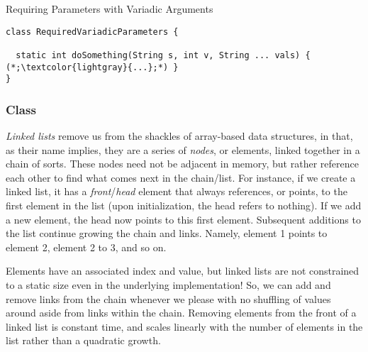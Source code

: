 
\begin{cl}[]{Requiring Parameters with Variadic Arguments}
\begin{lstlisting}[language=MyJava]
class RequiredVariadicParameters {

  static int doSomething(String s, int v, String ... vals) { (*;\textcolor{lightgray}{...};*) }
}
\end{lstlisting}
\end{cl}

\subsubsection*{ Class}
\textit{Linked lists} remove us from the shackles of array-based data structures, in that, as their name implies, they are a series of \textit{nodes}, or elements, linked together in a chain of sorts. These nodes need not be adjacent in memory, but rather reference each other to find what comes next in the chain/list. For instance, if we create a linked list, it has a \textit{front}/\textit{head} element that always references, or points, to the first element in the list (upon initialization, the head refers to nothing). If we add a new element, the head now points to this first element. Subsequent additions to the list continue growing the chain and links. Namely, element 1 points to element 2, element 2 to 3, and so on. 

Elements have an associated index and value, but linked lists are not constrained to a static size even in the underlying implementation! So, we can add and remove links from the chain whenever we please with no shuffling of values around aside from links within the chain. Removing elements from the front of a linked list is constant time, and scales linearly with the number of elements in the list rather than a quadratic growth.

